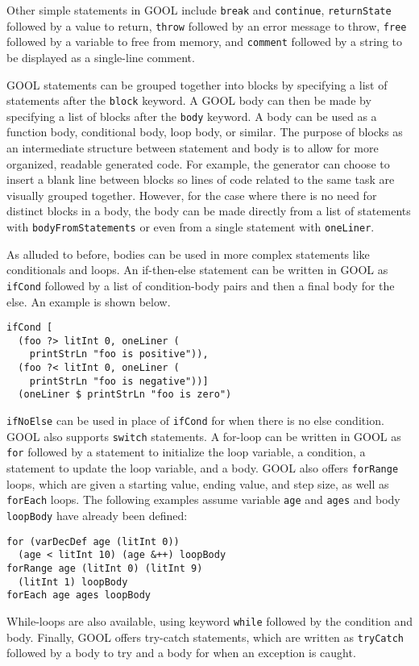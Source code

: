 \documentclass[sigplan,review,anonymous]{acmart}
\begin{document}
Other simple statements in GOOL include \verb|break| and \verb|continue|, 
\verb|returnState| followed by a value to return, \verb|throw| followed by an 
error message to throw, \verb|free| followed by a variable to free from
memory, and \verb|comment| followed by a string to be displayed as a 
single-line comment.

GOOL statements can be grouped together into blocks by specifying a list of 
statements after the \verb|block| keyword. A GOOL body can then be made by 
specifying a list of blocks after the \verb|body| keyword. A body can be used 
as a function body, conditional body, loop body, or similar. The purpose of 
blocks as an intermediate structure between statement and body is to allow for 
more organized, readable generated code. For example, the generator can choose 
to insert a blank line between blocks so lines of code related to the same task 
are visually grouped together. However, for the case where there is no need for 
distinct blocks in a body, the body can be made directly from a list of 
statements with \verb|bodyFromStatements| or even from a single statement with 
\verb|oneLiner|. 
 
As alluded to before, bodies can be used in more complex statements like 
conditionals and loops. An if-then-else statement can be written in GOOL as 
\verb|ifCond| followed by a list of condition-body pairs and then a final body 
for the else. An example is shown below.
\begin{lstlisting}
ifCond [
  (foo ?> litInt 0, oneLiner (
    printStrLn "foo is positive")),
  (foo ?< litInt 0, oneLiner (
    printStrLn "foo is negative"))] 
  (oneLiner $ printStrLn "foo is zero")
\end{lstlisting}
\verb|ifNoElse| can be used in place of \verb|ifCond| for when there is no else 
condition. GOOL also supports \verb|switch| statements. A for-loop can be 
written in GOOL as \verb|for| followed by a statement to 
initialize the loop variable, a condition, a statement to update the loop 
variable, and a body. GOOL also offers \verb|forRange| loops, which are given a 
starting value, ending value, and step size, as well as \verb|forEach| loops. 
The following examples assume variable \verb|age| and \verb|ages| and body 
\verb|loopBody| have already been defined:
\begin{lstlisting}
for (varDecDef age (litInt 0)) 
  (age < litInt 10) (age &++) loopBody
forRange age (litInt 0) (litInt 9) 
  (litInt 1) loopBody
forEach age ages loopBody
\end{lstlisting}
While-loops are also available, using keyword \verb|while| followed by the 
condition and body. Finally, GOOL offers try-catch statements, which are 
written as \verb|tryCatch| followed by a body to try and a body for when an 
exception is caught.
\end{document}
